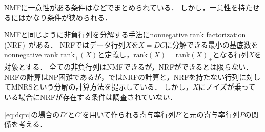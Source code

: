 NMFに一意性がある条件は\cite{Fu}などでまとめられている．
しかし，一意性を持たせるにはかなり条件が狭められる．

NMFと同じように非負行列を分解する手法にnonnegative rank factorization (NRF)~\cite{Dong2014}がある．
NRFではデータ行列$X$を$X = DC$に分解できる最小の基底数をnonnegative rank $\text{rank}_+(X)$と定義し，$\text{rank}(X) = \text{rank}(X)_+$となる行列$X$を対象とする．
全ての非負行列はNMFできるが，NRFができるとは限らない．
NRFの計算はNP困難であるが，\cite{Dong2014}ではNRFの計算と，NRFを持たない行列に対してMNRSという分解の計算方法を提示している．
しかし，$X$にノイズが乗っている場合にNRFが存在する条件は調査されていない．

\eqref{eq:dqrc}の場合の$D'$と$C'$を用いて作られる寄与率行列$P'$と元の寄与率行列$P$の関係を考える．
